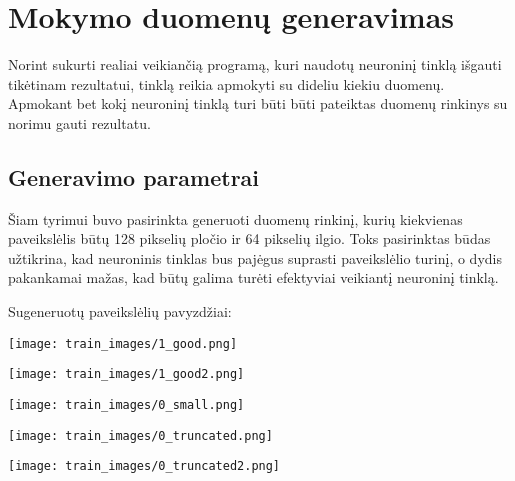 \documentclass{VUMIFPSkursinis}
\begin{document}
\section{Mokymo duomenų generavimas}
Norint sukurti realiai veikiančią programą, kuri naudotų neuroninį tinklą išgauti tikėtinam rezultatui,
tinklą reikia apmokyti su dideliu kiekiu duomenų. Apmokant bet kokį neuroninį tinklą turi būti būti pateiktas
duomenų rinkinys su norimu gauti rezultatu. 

\subsection{Generavimo parametrai}

Šiam tyrimui buvo pasirinkta generuoti duomenų rinkinį, kurių kiekvienas paveikslėlis būtų 128 pikselių
pločio ir 64 pikselių ilgio. Toks pasirinktas būdas užtikrina, kad neuroninis tinklas bus pajėgus suprasti 
paveikslėlio turinį, o dydis pakankamai mažas, kad būtų galima turėti efektyviai veikiantį neuroninį tinklą.

Sugeneruotų paveikslėlių pavyzdžiai:

\begin{minipage}{\linewidth}
  \centering
  \texttt{[image: train\_images/1\_good.png]}
\end{minipage}

\begin{minipage}{\linewidth}
  \centering
  \texttt{[image: train\_images/1\_good2.png]}
\end{minipage}

\begin{minipage}{\linewidth}
  \centering
  \texttt{[image: train\_images/0\_small.png]}
\end{minipage}

\begin{minipage}{\linewidth}
  \centering
  \texttt{[image: train\_images/0\_truncated.png]}
\end{minipage}

\begin{minipage}{\linewidth}
  \centering
  \texttt{[image: train\_images/0\_truncated2.png]}
\end{minipage}
\end{document}
